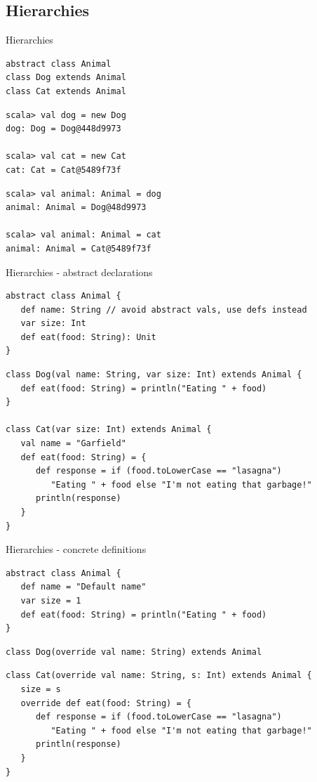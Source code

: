 \subsection{Hierarchies}
\begin{frame}[fragile]{Hierarchies}
\begin{lstlisting}
abstract class Animal
class Dog extends Animal
class Cat extends Animal
\end{lstlisting}

\begin{lstlisting}
scala> val dog = new Dog
dog: Dog = Dog@448d9973

scala> val cat = new Cat
cat: Cat = Cat@5489f73f
\end{lstlisting}

\begin{lstlisting}
scala> val animal: Animal = dog
animal: Animal = Dog@48d9973

scala> val animal: Animal = cat
animal: Animal = Cat@5489f73f
\end{lstlisting}
\end{frame}

\begin{frame}[fragile]{Hierarchies - abstract declarations}
\begin{lstlisting}
abstract class Animal {
   def name: String // avoid abstract vals, use defs instead
   var size: Int
   def eat(food: String): Unit
}
\end{lstlisting}

\begin{lstlisting}
class Dog(val name: String, var size: Int) extends Animal {
   def eat(food: String) = println("Eating " + food)
}

class Cat(var size: Int) extends Animal {
   val name = "Garfield"
   def eat(food: String) = {
      def response = if (food.toLowerCase == "lasagna")
         "Eating " + food else "I'm not eating that garbage!"     
      println(response)
   }
}
\end{lstlisting}
\end{frame}

\begin{frame}[fragile]{Hierarchies - concrete definitions}
\begin{lstlisting}
abstract class Animal {
   def name = "Default name"
   var size = 1
   def eat(food: String) = println("Eating " + food)
}
\end{lstlisting}

\begin{lstlisting}
class Dog(override val name: String) extends Animal
\end{lstlisting}

\begin{lstlisting}
class Cat(override val name: String, s: Int) extends Animal {
   size = s
   override def eat(food: String) = {
      def response = if (food.toLowerCase == "lasagna")
         "Eating " + food else "I'm not eating that garbage!"     
      println(response)
   }
}
\end{lstlisting}
\end{frame}

